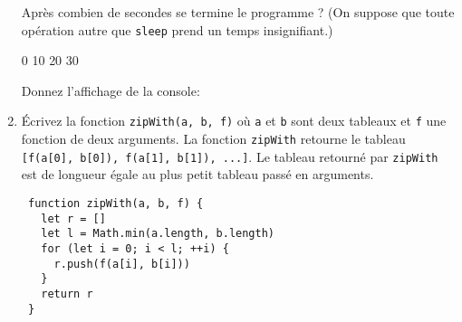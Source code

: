\documentclass[a4paper, 12pt]{article}
\newcommand{\choice}[1]{\Square\hspace{2pt} #1\hspace{5pt}}
\newcommand{\fullpoint}[1]{\textcolor{RubineRed}{#1}}
\newcommand{\choiceg}[1]{\fullpoint{\XBox\hspace{2pt} #1\hspace{5pt}}}
\begin{document}
\begin{enumerate}
  Après combien de secondes se termine le programme ?  (On suppose que toute
  opération autre que \lstinline{sleep} prend un temps insignifiant.)

  \choice{0} \choice{10} \choiceg{20} \choice{30}

  Donnez l'affichage de la console:

  \framebox{
    \fullpoint{1 3 2 4 5}
  }
\newpage
\item Écrivez la fonction \lstinline{zipWith(a, b, f)} où \lstinline{a} et
  \lstinline{b} sont deux tableaux et \lstinline{f} une fonction de deux
  arguments.  La fonction \lstinline{zipWith} retourne le tableau
  \lstinline{[f(a[0], b[0]), f(a[1], b[1]), ...]}.  Le tableau retourné par
  \lstinline{zipWith} est de longueur égale au plus petit tableau passé en
  arguments.

  \begin{lstlisting}
 function zipWith(a, b, f) {
   let r = []
   let l = Math.min(a.length, b.length)
   for (let i = 0; i < l; ++i) {
     r.push(f(a[i], b[i]))
   }
   return r
 }\end{lstlisting}
\end{enumerate}
\end{document}
